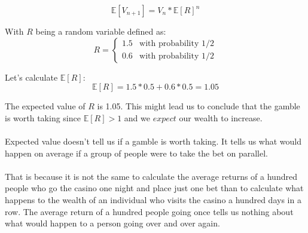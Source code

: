 \documentclass[12pt]{article}
\begin{document}
\begin{equation*}
  \mathbb{E}[V_{n+1}] = V_{n} * \mathbb{E}[R]^n
\end{equation*}

With $R$ being a random variable defined as:
\begin{equation*}
R = \left\{
	\begin{array}{ll}
		1.5 & \mbox{with probability 1/2} \\
		0.6 & \mbox{with probability 1/2}
	\end{array}
\right.
\end{equation*}

Let's calculate $\mathbb{E}[R]$:
\begin{equation*}
  \mathbb{E}[R] = 1.5 * 0.5 + 0.6 * 0.5 = 1.05
\end{equation*}

The expected value of $R$ is 1.05. This might lead us to conclude that the gamble is worth taking since $\mathbb{E}[R] > 1$ and we $expect$ our wealth to increase.
\\\\
Expected value doesn't tell us if a gamble is worth taking. It tells us what would happen on average if a group of people were to take the bet on parallel.
\\\\
That is because it is not the same to calculate the average returns of a hundred people who go the casino one night and place just one bet than to calculate what happens to the wealth of an individual who visits the casino a hundred days in a row. The average return of a hundred people going once tells us nothing about what would happen to a person going over and over again. 
\end{document}
